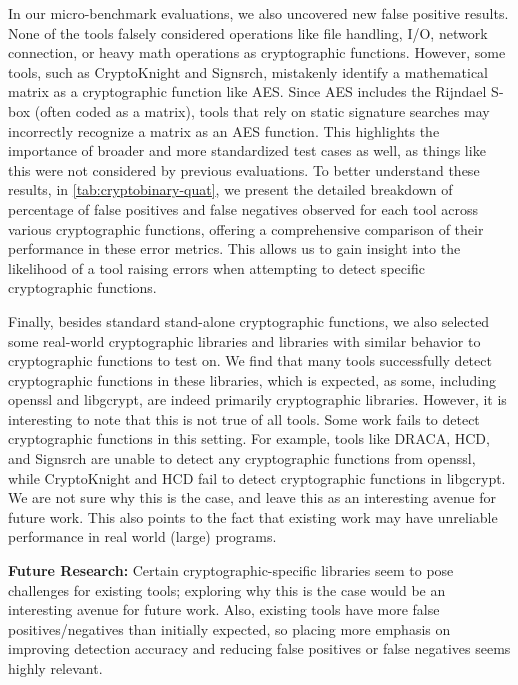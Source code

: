  In our micro-benchmark evaluations, we also uncovered new false positive results. None of the tools falsely considered operations like file handling, I/O, network connection, or heavy math operations as cryptographic functions. However, some tools, such as CryptoKnight and Signsrch, mistakenly identify a mathematical matrix as a cryptographic function like AES. Since AES includes the Rijndael S-box (often coded as a matrix), tools that rely on static signature searches may incorrectly recognize a matrix as an AES function. This highlights the importance of broader and more standardized test cases as well, as things like this were not considered by previous evaluations.
To better understand these results, in \autoref{tab:cryptobinary-quat}, we present the detailed breakdown of percentage of false positives and false negatives observed for each tool across various cryptographic functions, offering a comprehensive comparison of their performance in these error metrics. This allows us to gain insight into the likelihood of a tool raising errors when attempting to detect specific cryptographic functions.

 Finally, besides standard stand-alone cryptographic functions, we also selected some real-world cryptographic libraries and libraries with similar behavior to cryptographic functions to test on. We find that many tools successfully detect cryptographic functions in these libraries, which is expected, as some, including openssl and libgcrypt, are indeed primarily cryptographic libraries.
However, it is interesting to note that this is not true of all tools.  Some work fails to detect cryptographic functions in this setting.  For example, tools like DRACA, HCD, and Signsrch are unable to detect any cryptographic functions from openssl, while CryptoKnight and HCD fail to detect cryptographic functions in libgcrypt. We are not sure why this is the case, and leave this as an interesting avenue for future work.  This also points to the fact that existing work may have unreliable performance in real world (large) programs.

\begin{takeaway}
\textbf{Future Research:} Certain cryptographic-specific libraries seem to pose challenges for existing tools; exploring why this is the case would be an interesting avenue for future work.  Also, existing tools have more false positives/negatives than initially expected, so placing more emphasis on improving detection accuracy and reducing false positives or false negatives seems highly relevant.
\end{takeaway}

